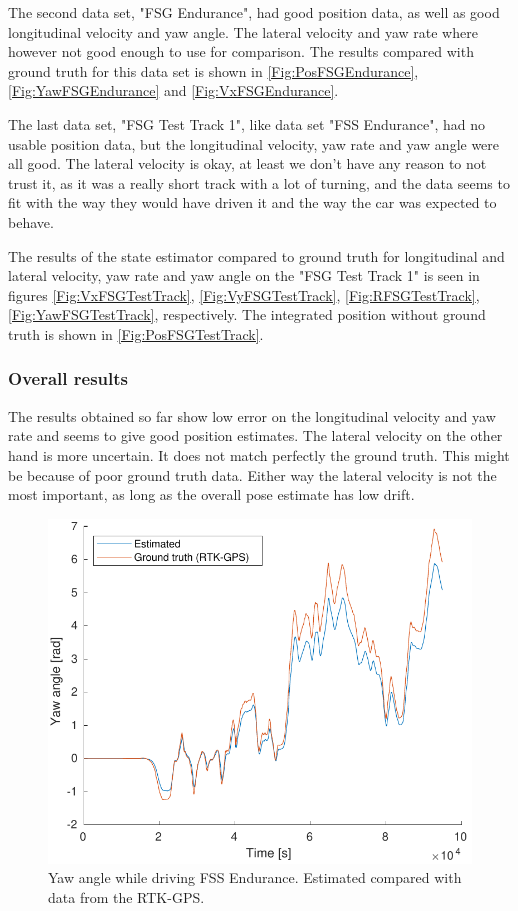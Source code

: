 The second data set, "FSG Endurance", had good position data, as well as good longitudinal velocity and yaw angle. The lateral velocity and yaw rate where however not good enough to use for comparison. The results compared with ground truth for this data set is shown in \ref{Fig:PosFSGEndurance}, \ref{Fig:YawFSGEndurance} and \ref{Fig:VxFSGEndurance}. 

The last data set, "FSG Test Track 1", like data set "FSS Endurance", had no usable position data, but the longitudinal velocity, yaw rate and yaw angle were all good. The lateral velocity is okay, at least we don't have any reason to not trust it, as it was a really short track with a lot of turning, and the data seems to fit with the way they would have driven it and the way the car was expected to behave. 

The results of the state estimator compared to ground truth for longitudinal  and lateral velocity, yaw rate and yaw angle on the "FSG Test Track 1" is seen in figures \ref{Fig:VxFSGTestTrack}, \ref{Fig:VyFSGTestTrack}, \ref{Fig:RFSGTestTrack}, \ref{Fig:YawFSGTestTrack}, respectively. The integrated position without ground truth is shown in \ref{Fig:PosFSGTestTrack}. 

\subsubsection{Overall results}

The results obtained so far show low error on the longitudinal velocity and yaw rate and seems to give good position estimates. The lateral velocity on the other hand is more uncertain. It does not match perfectly the ground truth. This might be because of poor ground truth data. Either way the lateral velocity is not the most important, as long as the overall pose estimate has low drift. 


\begin{figure}
    \centering
    \includegraphics[width=0.8\linewidth]{0_Images/6_Results/yawFSSEndurance.pdf}
    \caption[Yaw angle while driving FSS Endurance.]
    {Yaw angle while driving FSS Endurance. Estimated compared with data from the RTK-GPS.}
    \label{Fig:YawFSSEndurance}
\end{figure}

